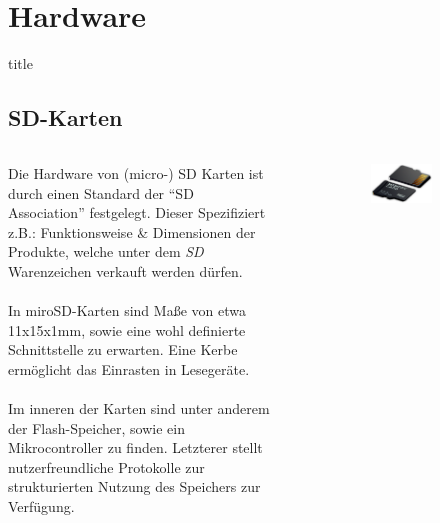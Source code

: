 \documentclass[ngerman]{schoolPres}
\newcommand{\FramedSection}[1]{
  \section{{#1}}%
  \begin{frame}%
    \vfill\begin{beamercolorbox}[sep=12pt, center]{title}%
      \usebeamerfont{title}{#1}\par%
    \end{beamercolorbox}\vfill%
  \end{frame}%
}
\begin{document}
  \FramedSection{Hardware}%
  \subsection{SD-Karten}%
  \begin{frame}
    \begin{columns}[c]
      \begin{column}{.6\linewidth}
        Die Hardware von (micro-) SD Karten ist durch einen Standard der \enquote{SD Association} festgelegt.
        Dieser Spezifiziert z.B.: Funktionsweise \& Dimensionen der Produkte, welche unter dem \emph{SD} Warenzeichen verkauft werden dürfen.\\~\\

        In miroSD-Karten sind Maße von etwa 11x15x1{mm}, sowie eine wohl definierte Schnittstelle zu erwarten.
        Eine Kerbe ermöglicht das Einrasten in Lesegeräte.\\~\\

        Im inneren der Karten sind unter anderem der Flash-Speicher, sowie ein Mikrocontroller zu finden.
        Letzterer stellt nutzerfreundliche Protokolle zur strukturierten Nutzung des Speichers zur Verfügung.
      \end{column}
      \begin{column}{.4\linewidth}
        \begin{figure}[!ht]
          \centering
          \begin{subfigure}{.65\linewidth}
            \includegraphics[width=\linewidth]{media/title_edit.jpg}
          \end{subfigure}\vspace{1em}


\end{figure}
\end{column}
\end{columns}
\end{frame}
\end{document}
